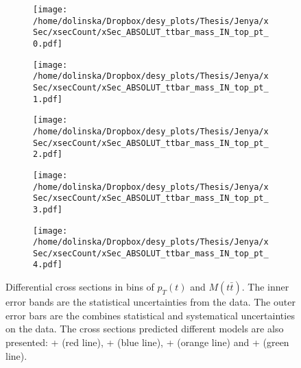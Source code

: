 \begin{sidewaysfigure}[p]
\centering
\begin{subfigure}
  \centering
  \texttt{[image: /home/dolinska/Dropbox/desy\_plots/Thesis/Jenya/xSec/xsecCount/xSec\_ABSOLUT\_ttbar\_mass\_IN\_top\_pt\_0.pdf]}
\end{subfigure}
\begin{subfigure}
  \centering
  \texttt{[image: /home/dolinska/Dropbox/desy\_plots/Thesis/Jenya/xSec/xsecCount/xSec\_ABSOLUT\_ttbar\_mass\_IN\_top\_pt\_1.pdf]}
\end{subfigure}
\begin{subfigure}
  \centering
  \texttt{[image: /home/dolinska/Dropbox/desy\_plots/Thesis/Jenya/xSec/xsecCount/xSec\_ABSOLUT\_ttbar\_mass\_IN\_top\_pt\_2.pdf]}
\end{subfigure}
\begin{subfigure}
  \centering
  \texttt{[image: /home/dolinska/Dropbox/desy\_plots/Thesis/Jenya/xSec/xsecCount/xSec\_ABSOLUT\_ttbar\_mass\_IN\_top\_pt\_3.pdf]}
\end{subfigure}
\begin{subfigure}
  \centering
  \texttt{[image: /home/dolinska/Dropbox/desy\_plots/Thesis/Jenya/xSec/xsecCount/xSec\_ABSOLUT\_ttbar\_mass\_IN\_top\_pt\_4.pdf]}
\end{subfigure}
\caption{Differential cross sections in bins of $p_{T}(t)$ and $M(t\bar{t})$. The inner error bands are the statistical uncertainties from the data.
         The outer error bars are the combines statistical and systematical uncertainties on the data. The cross sections predicted different models are also presented:
         \MG + \PYTHIA (red line), \Powheg + \PYTHIA (blue line), \Powheg + \HERWIG (orange line) and \MCNLO + \HERWIG (green line).}
\label{fig:XSU_2D_Mtt_pt1}
\end{sidewaysfigure}

